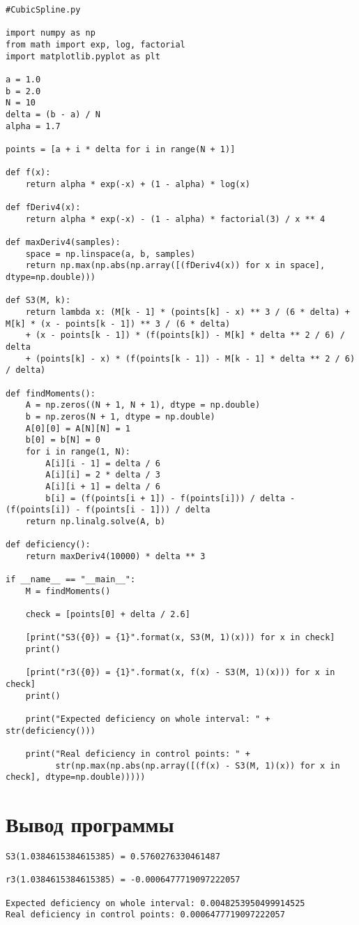 \documentclass[14pt, a4paper]{article}
\begin{document}
\begin{lstlisting}
#CubicSpline.py

import numpy as np
from math import exp, log, factorial
import matplotlib.pyplot as plt

a = 1.0
b = 2.0
N = 10
delta = (b - a) / N
alpha = 1.7

points = [a + i * delta for i in range(N + 1)]

def f(x):
    return alpha * exp(-x) + (1 - alpha) * log(x)

def fDeriv4(x):
    return alpha * exp(-x) - (1 - alpha) * factorial(3) / x ** 4

def maxDeriv4(samples):
    space = np.linspace(a, b, samples)
    return np.max(np.abs(np.array([(fDeriv4(x)) for x in space], dtype=np.double)))

def S3(M, k):
    return lambda x: (M[k - 1] * (points[k] - x) ** 3 / (6 * delta) + M[k] * (x - points[k - 1]) ** 3 / (6 * delta) 
    + (x - points[k - 1]) * (f(points[k]) - M[k] * delta ** 2 / 6) / delta
    + (points[k] - x) * (f(points[k - 1]) - M[k - 1] * delta ** 2 / 6) / delta)
        
def findMoments():
    A = np.zeros((N + 1, N + 1), dtype = np.double)
    b = np.zeros(N + 1, dtype = np.double)
    A[0][0] = A[N][N] = 1
    b[0] = b[N] = 0
    for i in range(1, N):
        A[i][i - 1] = delta / 6
        A[i][i] = 2 * delta / 3
        A[i][i + 1] = delta / 6
        b[i] = (f(points[i + 1]) - f(points[i])) / delta - (f(points[i]) - f(points[i - 1])) / delta
    return np.linalg.solve(A, b)

def deficiency():
    return maxDeriv4(10000) * delta ** 3

if __name__ == "__main__":
    M = findMoments()
    
    check = [points[0] + delta / 2.6]
    
    [print("S3({0}) = {1}".format(x, S3(M, 1)(x))) for x in check]
    print()
    
    [print("r3({0}) = {1}".format(x, f(x) - S3(M, 1)(x))) for x in check]
    print()
    
    print("Expected deficiency on whole interval: " + str(deficiency()))
    
    print("Real deficiency in control points: " + 
          str(np.max(np.abs(np.array([(f(x) - S3(M, 1)(x)) for x in check], dtype=np.double)))))
\end{lstlisting}

  \section{Вывод программы}
\begin{verbatim}
S3(1.0384615384615385) = 0.5760276330461487

r3(1.0384615384615385) = -0.0006477719097222057

Expected deficiency on whole interval: 0.0048253950499914525
Real deficiency in control points: 0.0006477719097222057

\end{verbatim}
\end{document}
